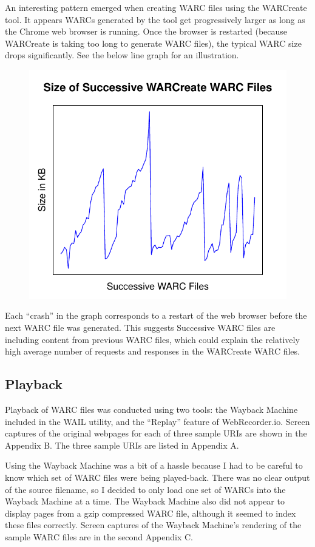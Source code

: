 \documentclass[a4paper,12pt]{article}
\begin{document}
An interesting pattern emerged when creating WARC files using the WARCreate tool. It appears WARCs generated by
the tool get progressively larger as long as the Chrome web browser is running. Once the browser is
restarted (because WARCreate is taking too long to generate WARC files), the typical WARC size drops
significantly. See the below line graph for an illustration.
\begin{figure}[H]
    \centering
    \includegraphics{stats/warcreate_ordered_sizes.pdf}
\end{figure}
Each ``crash'' in the graph corresponds to a restart of the web browser before the next WARC file was
generated. This suggests Successive WARC files are including content from previous WARC files, which
could explain the relatively high average number of requests and responses in the WARCreate WARC files.

\subsection{Playback}
Playback of WARC files was conducted using two tools: the Wayback Machine included in the WAIL utility,
and the ``Replay'' feature of WebRecorder.io. Screen captures of the original webpages for each of three sample
URIs are shown in the Appendix B. The three sample URIs are listed in Appendix A.

Using the Wayback Machine was a bit of a hassle because
I had to be careful to know which set of WARC files were being played-back. There was no clear output of
the source filename, so I decided to only load one set of WARCs into the Wayback Machine at a time. The
Wayback Machine also did not appear to display pages from a gzip compressed WARC file, although it seemed
to index these files correctly. Screen captures of the Wayback Machine's rendering of the sample WARC files
are in the second Appendix C.
\end{document}
